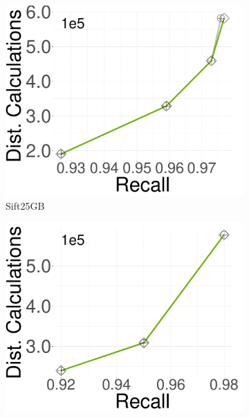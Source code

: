 \begin{figure}[ht]
          \begin{subfigure}[b]{0.28\textwidth}
              \captionsetup{justification=centering}
	\centering	
           \includegraphics[width=\textwidth]{../img/oigas/CandNeighbors/search/25GB/sift_DC.pdf}
        \caption{Sift25GB}
        \label{fig:oigas:cnn:25:sift}
    \end{subfigure}
    \hspace{0.4cm}
            \begin{subfigure}[b]{0.28\textwidth}
                \captionsetup{justification=centering}
	\centering	
           \includegraphics[width=\textwidth]{../img/oigas/CandNeighbors/search/100GB/sift_DC.pdf}

\end{subfigure}
\end{figure}
